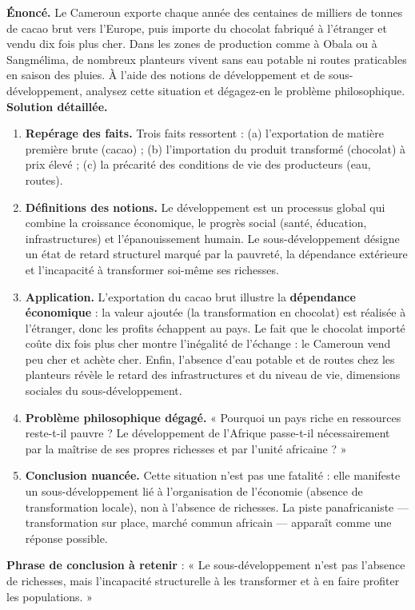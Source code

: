 \documentclass[11pt]{article}
\newcommand{\cle}[1]{{\popxbold\color{popdark}#1}}
\begin{document}
\begin{exoresolu}
\textbf{Énoncé.} Le Cameroun exporte chaque année des centaines de milliers de tonnes de cacao brut vers l'Europe, puis importe du chocolat fabriqué à l'étranger et vendu dix fois plus cher. Dans les zones de production comme à Obala ou à Sangmélima, de nombreux planteurs vivent sans eau potable ni routes praticables en saison des pluies. À l'aide des notions de développement et de sous-développement, analysez cette situation et dégagez-en le problème philosophique.
\tcblower
\textbf{Solution détaillée.}
\begin{enumerate}
\item \textbf{Repérage des faits.} Trois faits ressortent : (a) l'exportation de matière première brute (cacao) ; (b) l'importation du produit transformé (chocolat) à prix élevé ; (c) la précarité des conditions de vie des producteurs (eau, routes).
\item \textbf{Définitions des notions.} Le \cle{développement} est un processus global qui combine la croissance économique, le progrès social (santé, éducation, infrastructures) et l'épanouissement humain. Le \cle{sous-développement} désigne un état de retard structurel marqué par la pauvreté, la dépendance extérieure et l'incapacité à transformer soi-même ses richesses.
\item \textbf{Application.} L'exportation du cacao brut illustre la \textbf{dépendance économique} : la valeur ajoutée (la transformation en chocolat) est réalisée à l'étranger, donc les profits échappent au pays. Le fait que le chocolat importé coûte dix fois plus cher montre l'inégalité de l'échange : le Cameroun vend peu cher et achète cher. Enfin, l'absence d'eau potable et de routes chez les planteurs révèle le retard des infrastructures et du niveau de vie, dimensions sociales du sous-développement.
\item \textbf{Problème philosophique dégagé.} « Pourquoi un pays riche en ressources reste-t-il pauvre ? Le développement de l'Afrique passe-t-il nécessairement par la maîtrise de ses propres richesses et par l'unité africaine ? »
\item \textbf{Conclusion nuancée.} Cette situation n'est pas une fatalité : elle manifeste un sous-développement lié à l'organisation de l'économie (absence de transformation locale), non à l'absence de richesses. La piste panafricaniste — transformation sur place, marché commun africain — apparaît comme une réponse possible.
\end{enumerate}
\textbf{Phrase de conclusion à retenir} : « Le sous-développement n'est pas l'absence de richesses, mais l'incapacité structurelle à les transformer et à en faire profiter les populations. »
\end{exoresolu}
\end{document}
